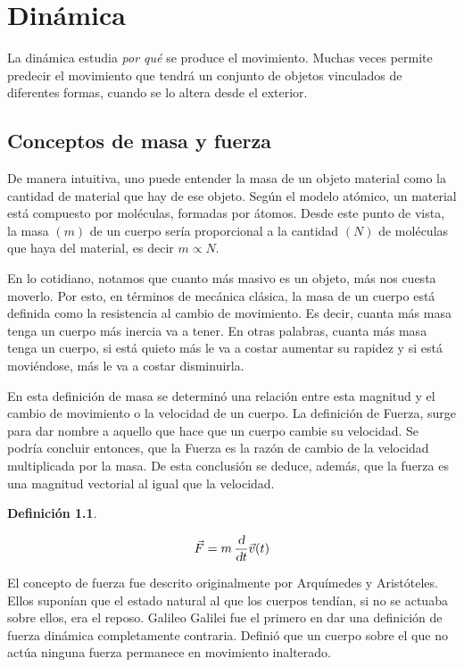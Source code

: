 \documentclass[a5paper,12pt,twoside]{book}
\newtheorem{defn}{{Definición}}[chapter]
\begin{document}
\chapter{Dinámica}
\label{cha:dinamics}


La dinámica estudia \emph{por qué} se produce el movimiento.
Muchas veces permite predecir el movimiento que tendrá un conjunto de objetos vinculados de diferentes formas, cuando se lo altera desde el exterior.


\section{Conceptos de masa y fuerza}

De manera intuitiva, uno puede entender la masa de un objeto material como la cantidad de material que hay de ese objeto. Según el modelo atómico, un material está compuesto por moléculas, formadas por átomos. Desde este punto de vista, la masa $(m)$ de un cuerpo sería proporcional a la cantidad $(N)$ de moléculas que haya del material, es decir $ m \propto N $.

En lo cotidiano, notamos que cuanto más masivo es un objeto, más nos cuesta moverlo. Por esto, en términos de mecánica clásica, la masa de un cuerpo está definida como la resistencia al cambio de movimiento. Es decir, cuanta más masa tenga un cuerpo más inercia va a tener. En otras palabras, cuanta más masa tenga un cuerpo, si está quieto más le va a costar aumentar su rapidez y si está moviéndose, más le va a costar disminuirla.

En esta definición de masa se determinó una relación entre esta magnitud y el cambio de movimiento o la velocidad de un cuerpo. La definición de Fuerza, surge para dar nombre a aquello que hace que un cuerpo cambie su velocidad. Se podría concluir entonces, que la Fuerza es la razón de cambio de la velocidad multiplicada por la masa. De esta conclusión se deduce, además, que la fuerza es una magnitud vectorial al igual que la velocidad.

\begin{mdframed}[style=MyFrame1]
    \begin{defn}
        \label{defn:force}
    \end{defn}
    \begin{equation*}
        \Vec{F} = m \, \frac{\textsl{d}}{\textsl{d} t} \Vec{v}(t)
    \end{equation*}
\end{mdframed}

El concepto de fuerza fue descrito originalmente por Arquímedes y Aristóteles. Ellos suponían que el estado natural al que los cuerpos tendían, si no se actuaba sobre ellos, era el reposo. Galileo Galilei fue el primero en dar una definición de fuerza dinámica completamente contraria. Definió que un cuerpo sobre el que no actúa ninguna fuerza permanece en movimiento inalterado.
\end{document}
